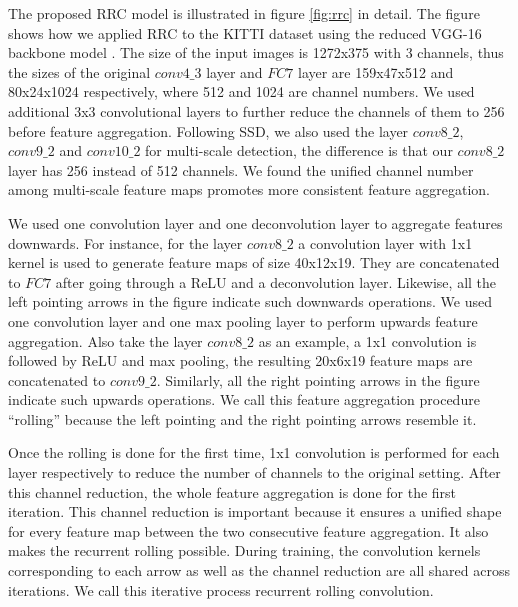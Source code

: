 \documentclass[10pt,twocolumn,letterpaper]{article}
\begin{document}
The proposed RRC model is illustrated in figure \ref{fig:rrc} in detail. The figure shows how we applied RRC to the KITTI dataset using the reduced VGG-16 backbone model \cite{liu15ssd,liu15}. The size of the input images is 1272x375 with 3 channels, thus the sizes of the original $conv4\_3$ layer and $FC7$ layer are 159x47x512 and 80x24x1024 respectively, where 512 and 1024 are channel numbers. We used additional 3x3 convolutional layers to further reduce the channels of them to 256 before feature aggregation. Following SSD, we also used the layer $conv8\_2$, $conv9\_2$ and $conv10\_2$ for multi-scale detection, the difference is that our $conv8\_2$ layer has 256 instead of 512 channels. We found the unified channel number among multi-scale feature maps promotes more consistent feature aggregation.

We used one convolution layer and one deconvolution layer to aggregate features downwards. For instance, for the layer $conv8\_2$ a convolution layer with 1x1 kernel is used to generate feature maps of size 40x12x19. They are concatenated to $FC7$ after going through a ReLU and a deconvolution layer. Likewise, all the left pointing arrows in the figure indicate such downwards operations. We used one convolution layer and one max pooling layer to perform upwards feature aggregation. Also take the layer $conv8\_2$ as an example, a 1x1 convolution is followed by ReLU and max pooling, the resulting 20x6x19 feature maps are concatenated to $conv9\_2$. Similarly, all the right pointing arrows in the figure indicate such upwards operations. We call this feature aggregation procedure ``rolling'' because the left pointing and the right pointing arrows resemble it.

Once the rolling is done for the first time, 1x1 convolution is performed for each layer respectively to reduce the number of channels to the original setting. After this channel reduction, the whole feature aggregation is done for the first iteration. This channel reduction is important because it ensures a unified shape for every feature map between the two consecutive feature aggregation. It also makes the recurrent rolling possible. During training, the convolution kernels corresponding to each arrow as well as the channel reduction are all shared across iterations. We call this iterative process recurrent rolling convolution.
\end{document}
